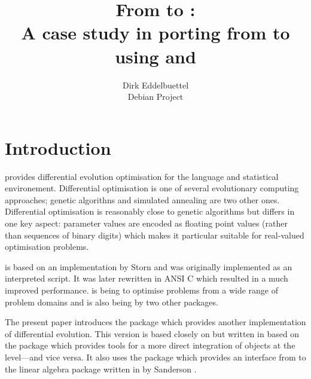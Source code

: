 \documentclass[nojss,shortnames,article]{jss}
\author{Dirk Eddelbuettel\\Debian Project} %
\title{From \pkg{DEoptim} to \pkg{RcppDE}: \\
  A case study in porting from \proglang{C} to \proglang{C++} \\
  using \pkg{Rcpp} and \pkg{RcppArmadillo}}
\begin{document}
\section{Introduction}

\citep{MullenArdiaEtAl:2009:DEoptim,ArdiaBoudtCarlEtAl:2010:DEoptim,CRAN:DEoptim}
provides differential evolution optimisation for the  language
and statistical environement.  Differential optimisation is one of several
evolutionary computing approaches; genetic algorithns and simulated annealing
are two other ones.  Differential optimisation is reasonably close to genetic
algorithms but differs in one key aspect: parameter values are encoded as
floating point values (rather than sequences of binary digits) which makes it
particular suitable for real-valued optimisation problems.

 is based on an implementation by Storn
\citep{PriceStornLampinen:2006:DE} and was originally implemented as an
interpreted  script. It was later rewritten in ANSI C which
resulted in a much improved performance.  is being to optimise
problems from a wide range of problem domains and is also being by two other
packages.

The present paper introduces the  package  which
provides another implementation of differential evolution. This version is
based closely on  but written in  based on the
 package \citep{CRAN:Rcpp} which provides tools for a more direct
integration of  objects at the  level---and vice
versa. It also uses the  package which provides an
interface from  to the  linear algebra package
written in  by Sanderson \citep{Sanderson:2010:Armadillo}.
\end{document}
